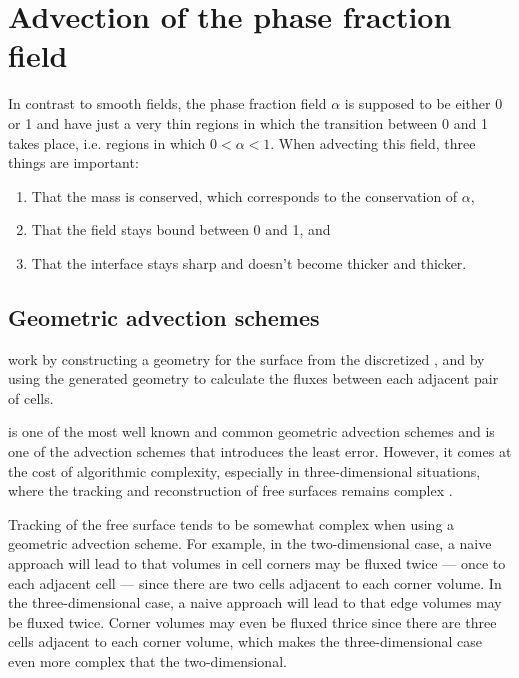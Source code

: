 \section{Advection of the phase fraction field}

\label{sec:advection_of_phase_fraction}

In contrast to smooth fields, the phase fraction field $\alpha$ is supposed to be either 0 or 1 and have just a very thin regions in which the transition between 0 and 1 takes place, i.e. regions in which $0 < \alpha < 1$. When advecting this field, three things are important:

\begin{enumerate}
\item That the mass is conserved, which corresponds to the conservation of $\alpha$,
\item That the field stays bound between 0 and 1, and
\item That the interface stays sharp and doesn't become thicker and thicker.
\end{enumerate}

\subsection{Geometric advection schemes}

 work by constructing a geometry for the surface from the discretized , and by using the generated geometry to calculate the fluxes between each adjacent pair of cells.

\PLIC is one of the most well known and common geometric advection schemes and is one of the advection schemes that introduces the least error. However, it comes at the cost of algorithmic complexity, especially in three-dimensional situations, where the tracking and reconstruction of free surfaces remains complex \citep{Ingram2009}.

Tracking of the free surface tends to be somewhat complex when using a geometric advection scheme. For example, in the two-dimensional case, a naive approach will lead to that volumes in cell corners may be fluxed twice --- once to each adjacent cell --- since there are two cells adjacent to each corner volume. In the three-dimensional case, a naive approach will lead to that edge volumes may be fluxed twice. Corner volumes may even be fluxed thrice since there are three cells adjacent to each corner volume, which makes the three-dimensional case even more complex that the two-dimensional.

